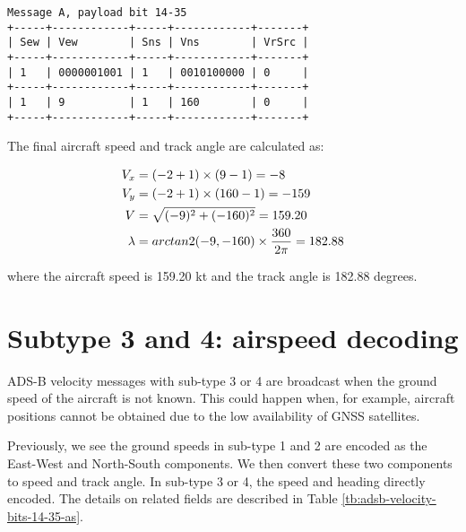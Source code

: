 \begin{verbatim}
Message A, payload bit 14-35
+-----+------------+-----+------------+-------+
| Sew | Vew        | Sns | Vns        | VrSrc |
+-----+------------+-----+------------+-------+
| 1   | 0000001001 | 1   | 0010100000 | 0     |
+-----+------------+-----+------------+-------+
| 1   | 9          | 1   | 160        | 0     |
+-----+------------+-----+------------+-------+
\end{verbatim}

The final aircraft speed and track angle are calculated as:

\begin{align}
  V_x &= (-2\time1 + 1) \times (9 - 1)  = -8 \\
  V_y &= (-2\time1 + 1) \times (160 - 1) = -159 \\
  V &= \sqrt{(-9)^2+ (-160)^2} = 159.20 \\
  \lambda &= arctan2(-9, -160) \times \frac{360}{2\pi} = 182.88
\end{align}

where the aircraft speed is 159.20 kt and the track angle is 182.88 degrees.


\section{Subtype 3 and 4: airspeed decoding}

ADS-B velocity messages with sub-type 3 or 4 are broadcast when the ground speed of the aircraft is not known. This could happen when, for example, aircraft positions cannot be obtained due to the low availability of GNSS satellites.

Previously, we see the ground speeds in sub-type 1 and 2 are encoded as the East-West and North-South components. We then convert these two components to speed and track angle. In sub-type 3 or 4, the speed and heading directly encoded. The details on related fields are described in Table \ref{tb:adsb-velocity-bits-14-35-as}.

